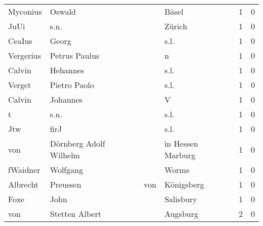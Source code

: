 \begin{tabular}{llllrr}
                 Myconius &                             Oswald &             &                                       Bäsel &          1 &         0 \\
                     JuUi &                               s.n. &             &                                      Zürich &          1 &         0 \\
                   CeaIus &                              Georg &             &                                        s.l. &          1 &         0 \\
                Vergerius &                      Petrus Paulus &             &                                           n &          1 &         0 \\
                   Calvin &                           Hehannes &             &                                        s.l. &          1 &         0 \\
                   Verget &                       Pietro Paolo &             &                                        s.l. &          1 &         0 \\
                   Calvin &                           Johannes &             &                                           V &          1 &         0 \\
                        t &                               s.n. &             &                                        s.l. &          1 &         0 \\
                      Jtw &                               firJ &             &                                        s.l. &          1 &         0 \\
                      von &             Dörnberg Adolf Wilhelm &             &                           in Hessen Marburg &          1 &         0 \\
                 fWaidner &                           Wolfgang &             &                                       Worms &          1 &         0 \\
                 Albrecht &                           Preussen &         von &                                  Königsberg &          1 &         0 \\
                     Foxe &                               John &             &                                   Salisbury &          1 &         0 \\
                      von &                     Stetten Albert &             &                                    Augsburg &          2 &         0 \\

\end{tabular}
